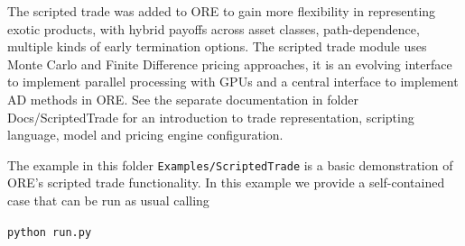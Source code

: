 The scripted trade was added to ORE to gain more flexibility in representing exotic products, with hybrid payoffs across
asset classes, path-dependence, multiple kinds of early termination options. The scripted trade module uses Monte Carlo and
Finite Difference pricing approaches, it is an evolving interface to implement parallel processing with GPUs and a central
interface to implement AD methods in ORE. See the separate documentation in folder Docs/ScriptedTrade for an introduction to trade
representation, scripting language, model and pricing engine configuration.

\medskip
The example in this folder {\tt Examples/ScriptedTrade} is a basic demonstration of ORE's scripted trade functionality.
In this example we provide a self-contained case that can be run as usual calling

\medskip
\centerline{\tt python run.py}

\medskip

